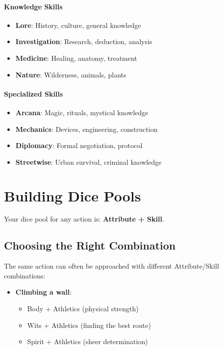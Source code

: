 \begin{multicols}{2}
\paragraph{Knowledge Skills}
\begin{itemize}
\item \textbf{Lore}: History, culture, general knowledge
\item \textbf{Investigation}: Research, deduction, analysis
\item \textbf{Medicine}: Healing, anatomy, treatment
\item \textbf{Nature}: Wilderness, animals, plants
\end{itemize}

\paragraph{Specialized Skills}
\begin{itemize}
\item \textbf{Arcana}: Magic, rituals, mystical knowledge
\item \textbf{Mechanics}: Devices, engineering, construction
\item \textbf{Diplomacy}: Formal negotiation, protocol
\item \textbf{Streetwise}: Urban survival, criminal knowledge
\end{itemize}

\section{Building Dice Pools}

Your dice pool for any action is: \textbf{Attribute + Skill}.

\subsection*{Choosing the Right Combination}
The same action can often be approached with different Attribute/Skill combinations:

\begin{itemize}
\item \textbf{Climbing a wall}:
  \begin{itemize}
  \item Body + Athletics (physical strength)
  \item Wits + Athletics (finding the best route)
  \item Spirit + Athletics (sheer determination)
  \end{itemize}


\end{itemize}
\end{multicols}
